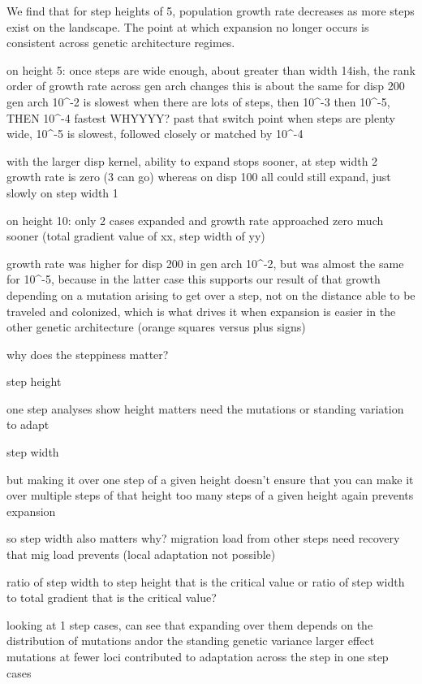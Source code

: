 We find that for step heights of 5, population growth rate decreases as more steps exist on the landscape. The point at which expansion no longer occurs is consistent across genetic architecture regimes.

on height 5:
once steps are wide enough, about greater than width 14ish, the rank order of growth rate across gen arch changes
this is about the same for disp 200
gen arch 10^-2 is slowest when there are lots of steps, then 10^-3 then 10^-5, THEN 10^-4 fastest WHYYYY?
past that switch point when steps are plenty wide, 10^-5 is slowest, followed closely or matched by 10^-4

with the larger disp kernel, ability to expand stops sooner, at step width 2 growth rate is zero (3 can go) whereas on disp 100 all could still expand, just slowly on step width 1


on height 10:
only 2 cases expanded and growth rate approached zero much sooner (total gradient value of xx, step width of yy)

growth rate was higher for disp 200 in gen arch 10^-2, but was almost the same for 10^-5, because in the latter case this supports our result of that growth depending on a mutation arising to get over a step, not on the distance able to be traveled and colonized, which is what drives it when expansion is easier in the other genetic architecture (orange squares versus plus signs)

why does the steppiness matter?

step height

	one step analyses show height matters
	need the mutations or standing variation to adapt


step width

	but making it over one step of a given height doesn't ensure that you can make it over multiple steps of that height
	too many steps of a given height again prevents expansion
	
	so step width also matters
		why?
		migration load from other steps
		need recovery that mig load prevents (local adaptation not possible)
		
		ratio of step width to step height that is the critical value
		or ratio of step width to total gradient that is the critical value?






	looking at 1 step cases, can see that expanding over them depends on the distribution of mutations and\/or the standing genetic variance
	larger effect mutations at fewer loci contributed to adaptation across the step in one step cases
	



